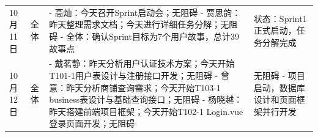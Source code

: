 \begin{levellist}
\begin{longtable}{>{\centering\arraybackslash}m{1cm} >{\centering\arraybackslash}m{1cm} >{\centering\arraybackslash}m{8.5cm} >{\centering\arraybackslash}m{3cm}}
        \bottomrule
        \endfoot


        10月11日                                              & 全体                                                                               & - 高灿：今天召开Sprint启动会；无阻碍 \newline
        - 贾思韵：昨天整理需求文档；今天进行详细任务分解；无阻碍 \newline
        - 全体：确认Sprint目标为7个用户故事，总计39故事点                      & 状态：Sprint1正式启动，任务分解完成                                                                                                                                                                      \\

        10月12日                                              & 全体                                                                               & - 戴茗静：昨天分析用户认证技术方案；今天开始T101-1用户表设计与注册接口开发；无阻碍 \newline
        - 曾意：昨天分析商铺查询需求；今天开始T103-1 business表设计与基础查询接口；无阻碍 \newline
        - 杨晓越：昨天搭建前端项目框架；今天开始T102-1 Login.vue登录页面开发；无阻碍     & 无阻碍 - 项目启动，数据库设计和页面框架并行开发                                                                                                                                                                  \\



\end{longtable}
\end{levellist}
